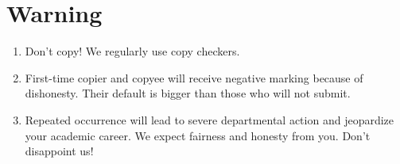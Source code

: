 \documentclass[11pt, a4paper]{article}
\begin{document}
\section{Warning}
\begin{enumerate}
    \item Don't copy! We regularly use copy checkers.
    \item First-time copier and copyee will receive negative marking because of dishonesty. Their default is bigger than those who will not submit.
    \item Repeated occurrence will lead to severe departmental action and jeopardize your academic career. We expect fairness and honesty from you. Don't disappoint us!
\end{enumerate}
\end{document}
